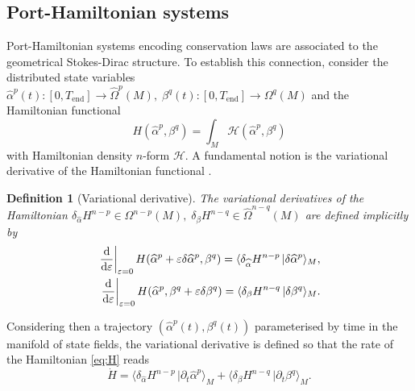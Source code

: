 \documentclass{elsarticle}
\newtheorem{definition}{Definition}
\newcommand*{\dual}[1]{\ensuremath{\widehat{#1}}}
\newcommand{\dualpr}[3][]{\ensuremath{\langle #2 \, \vert #3 \rangle_{#1}}}
\begin{document}
\subsection{Port-Hamiltonian systems}
Port-Hamiltonian systems encoding conservation laws are associated to the geometrical Stokes-Dirac structure. To establish this connection, consider the distributed state variables $\dual{\alpha}^p(t) : [0, T_{\text{end}}] \rightarrow \dual{\Omega}^p(M), \; \beta^{q}(t) : [0, T_{\text{end}}] \rightarrow \Omega^q(M)$ and the Hamiltonian functional 
\begin{equation}\label{eq:H}
H(\dual{\alpha}^p, \beta^{q}) = \int_M
\mathcal{H}(\dual{\alpha}^p, \beta^{q})
\end{equation}
with Hamiltonian density $n$-form $\mathcal{H}$. A fundamental notion is the variational derivative of the Hamiltonian functional \cite{olver1986applications, vanderSchaft2002}. 
\begin{definition}[Variational derivative]\label{def:var_der}
The variational derivatives of the Hamiltonian $\delta_{\dual{\alpha}} H^{n-p} \in \Omega^{n-p}(M), \; \delta_{\beta} H^{n-q} \in \dual{\Omega}^{n-q}(M)$ are defined implicitly by
\begin{equation*}
\begin{aligned}
    \left.\diff{}{\varepsilon}\right|_{\varepsilon = 0} H(\dual{\alpha}^p + \varepsilon \delta \dual{\alpha}^p, \beta^{q}) = \dualpr[M]{\delta_{\dual{\alpha}} H^{n-p}}{\delta \dual{\alpha}^p}, \\
    \left.\diff{}{\varepsilon}\right|_{\varepsilon = 0} H(\dual{\alpha}^p, \beta^{q} + \varepsilon \delta \beta^{q}) = \dualpr[M]{\delta_{\beta} H^{n-q}}{\delta \beta^{q}}.
\end{aligned}
\end{equation*}
\end{definition}

Considering then a trajectory $(\dual{\alpha}^p(t),\beta^{q}(t))$ parameterised by time in the manifold of state fields, the variational derivative is defined so that the rate of the Hamiltonian \eqref{eq:H} reads
\begin{equation}\label{eq:H_dot}
    \dot{H} = \dualpr[M]{\delta_{\dual{\alpha}} H^{n-p}}{\partial_t \dual{\alpha}^p} + \dualpr[M]{\delta_{\beta} H^{n-q}}{\partial_t \beta^{q}}.
\end{equation}
\end{document}

